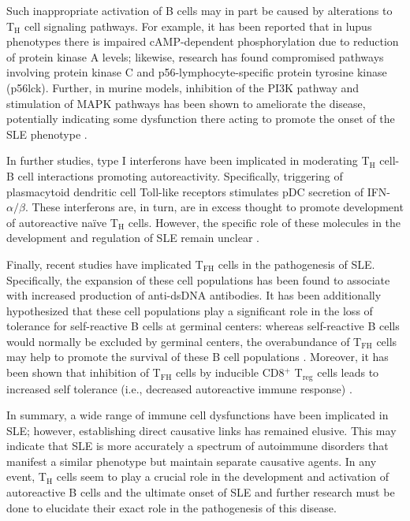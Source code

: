 \documentclass[11pt,letterpaper,final] {article}
\newcommand{\sub}[1]{\ensuremath{_{\text{#1}}}}
\begin{document}
Such inappropriate activation of B cells may in part be caused by alterations to T\sub{H} cell signaling pathways. For example, it has been reported that in lupus phenotypes there is impaired cAMP-dependent phosphorylation due to reduction of protein kinase A levels; likewise, research has found compromised pathways involving protein kinase C and p56-lymphocyte-specific protein tyrosine kinase (p56lck). Further, in murine models, inhibition of the PI3K pathway and stimulation of MAPK pathways has been shown to ameliorate the disease, potentially indicating some dysfunction there acting to promote the onset of the SLE phenotype \cite{Mak:2014}.

In further studies, type I interferons have been implicated in moderating T\sub{H} cell-B cell interactions promoting autoreactivity. Specifically, triggering of plasmacytoid dendritic cell Toll-like receptors stimulates pDC secretion of IFN-$\alpha/\beta$. These interferons are, in turn, are in excess thought to promote development of autoreactive na\"{i}ve T\sub{H} cells. However, the specific role of these molecules in the development and regulation of SLE remain unclear \cite{Mangini:2007}.

Finally, recent studies have implicated T\sub{FH} cells in the pathogenesis of SLE. Specifically, the expansion of these cell populations has been found to associate with increased production of anti-dsDNA antibodies. It has been additionally hypothesized that these cell populations play a significant role in the loss of tolerance for self-reactive B cells at germinal centers: whereas self-reactive B cells would normally be excluded by germinal centers, the overabundance of T\sub{FH} cells may help to promote the survival of these B cell populations \cite{Dong:2011}. Moreover, it has been shown that inhibition of T\sub{FH} cells by inducible CD8$^{\text{+}}$ T\sub{reg} cells leads to increased self tolerance (i.e., decreased autoreactive immune response) \cite{Kim:2010}.

In summary, a wide range of immune cell dysfunctions have been implicated in SLE; however, establishing direct causative links has remained elusive. This may indicate that SLE is more accurately a spectrum of autoimmune disorders that manifest a similar phenotype but maintain separate causative agents. In any event, T\sub{H} cells seem to play a crucial role in the development and activation of autoreactive B cells and the ultimate onset of SLE and further research must be done to elucidate their exact role in the pathogenesis of this disease.


\clearpage


\nocite{*}
\end{document}

